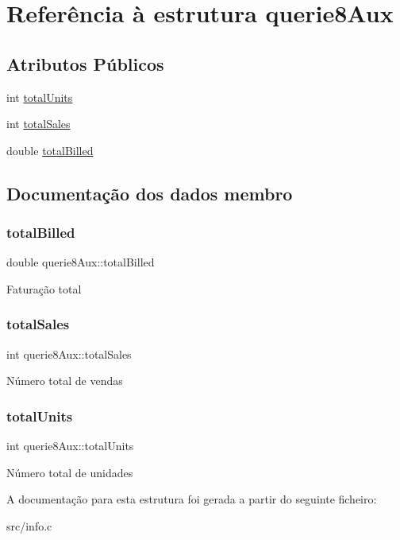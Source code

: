\hypertarget{structquerie8Aux}{}\section{Referência à estrutura querie8\+Aux}
\label{structquerie8Aux}
\subsection*{Atributos Públicos}
\begin{DoxyCompactItemize}
\item 
int \hyperlink{structquerie8Aux_ac0c63f140fea7f5f7cdc7ee0729e38e7}{total\+Units}
\item 
int \hyperlink{structquerie8Aux_a2f12deee7c225ae2bdd2baab37b5fc59}{total\+Sales}
\item 
double \hyperlink{structquerie8Aux_ae5908269ec2419cd4c17303d769162e2}{total\+Billed}
\end{DoxyCompactItemize}


\subsection{Documentação dos dados membro}
\mbox{\label{structquerie8Aux_ae5908269ec2419cd4c17303d769162e2}} 
\subsubsection{\texorpdfstring{total\+Billed}{totalBilled}}
{\footnotesize\ttfamily double querie8\+Aux\+::total\+Billed}

Faturação total \mbox{\label{structquerie8Aux_a2f12deee7c225ae2bdd2baab37b5fc59}} 
\subsubsection{\texorpdfstring{total\+Sales}{totalSales}}
{\footnotesize\ttfamily int querie8\+Aux\+::total\+Sales}

Número total de vendas \mbox{\label{structquerie8Aux_ac0c63f140fea7f5f7cdc7ee0729e38e7}} 
\subsubsection{\texorpdfstring{total\+Units}{totalUnits}}
{\footnotesize\ttfamily int querie8\+Aux\+::total\+Units}

Número total de unidades 

A documentação para esta estrutura foi gerada a partir do seguinte ficheiro\+:\begin{DoxyCompactItemize}
\item 
src/info.\+c\end{DoxyCompactItemize}
